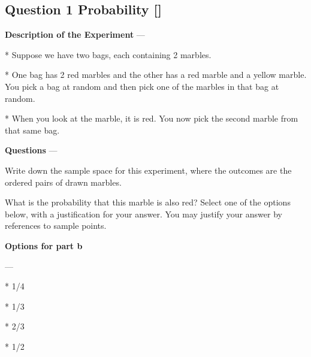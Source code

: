 

\subsection*{Question 1 Probability []}

\textbf{Description of the Experiment}
--- 

* Suppose we have two bags, each containing 2 marbles. 

* One bag has 2 red marbles and
the other has a red marble and a yellow marble. 
You pick a bag at random and then pick
one of the marbles in that bag at random. 

* When you look at the marble, it is red. 
You
now pick the second marble from that same bag.
 
\textbf{Questions}
--- 

\item[(a)]  Write down the sample space for this experiment, where the outcomes are the ordered pairs of drawn marbles.

\item[(b)] What is the probability that this marble
is also red? Select one of the options below, with a justification for your answer.
You may justify your answer by references to sample points.

\textbf{Options for part b}
\begin{center}
\begin{multicols}{4}
--- 

* 1/4

* 1/3

* 2/3

*  1/2

\end{multicols}
\end{center}


